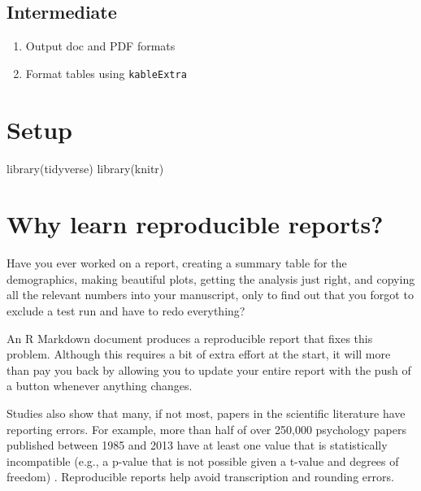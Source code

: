 \documentclass[
  oneside]{book}
\newenvironment{Shaded}{\begin{snugshade}}{\end{snugshade}}
\newcommand{\FunctionTok}[1]{\textcolor[rgb]{0.00,0.00,0.00}{#1}}
\newcommand{\NormalTok}[1]{#1}
\providecommand{\tightlist}{%
  \setlength{\itemsep}{0pt}\setlength{\parskip}{0pt}}
\begin{document}
\hypertarget{intermediate}{%
\subsection*{Intermediate}\label{intermediate}}

\begin{enumerate}
\def\labelenumi{\arabic{enumi}.}
\setcounter{enumi}{7}
\tightlist
\item
  Output doc and PDF formats
\item
  Format tables using \texttt{kableExtra}
\end{enumerate}

\hypertarget{setup-repro}{%
\section{Setup}\label{setup-repro}}

\begin{Shaded}
\begin{Highlighting}[]
\FunctionTok{library}\NormalTok{(tidyverse)}
\FunctionTok{library}\NormalTok{(knitr)}
\end{Highlighting}
\end{Shaded}

\hypertarget{why-learn-reproducible-reports}{%
\section{Why learn reproducible reports?}\label{why-learn-reproducible-reports}}

Have you ever worked on a report, creating a summary table for the demographics, making beautiful plots, getting the analysis just right, and copying all the relevant numbers into your manuscript, only to find out that you forgot to exclude a test run and have to redo everything?

An R Markdown document produces a reproducible report that fixes this problem. Although this requires a bit of extra effort at the start, it will more than pay you back by allowing you to update your entire report with the push of a button whenever anything changes.

Studies also show that many, if not most, papers in the scientific literature have reporting errors. For example, more than half of over 250,000 psychology papers published between 1985 and 2013 have at least one value that is statistically incompatible (e.g., a p-value that is not possible given a t-value and degrees of freedom) \citep{nuijten2016prevalence}. Reproducible reports help avoid transcription and rounding errors.
\end{document}
